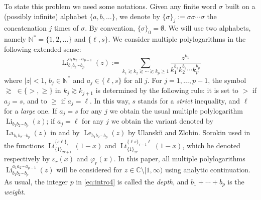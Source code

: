 \documentclass[reqno,12pt]{amsart}
\numberwithin{equation}{section}
\theoremstyle{remark}
\def\li{\operatorname{Li}}
\newcommand{\C}{\mathbb{C}}
\begin{document}
To state this problem we need some notations. 
Given any finite word $\sigma$ built on a (possibly infinite) alphabet $\{a,b, \ldots\}$, 
we denote by   $\{\sigma\}_j:=\sigma\sigma\cdots \sigma$   the 
concatenation $j$ times of $\sigma$. By convention, $\{\sigma\}_0=\emptyset$. We will use two alphabets, 
namely $\mathbb N^{*} = \{1,2,\ldots\}$ 
and $\{\ell,s\}$. We consider  multiple polylogarithms in the following extended sense:
\begin{equation}\label{eq:intro4}
\li_{b_1b_2\cdots b_p}^{a_1a_2\cdots a_{p-1}}(z):=
\sum_{k_1\gtrsim k_2\gtrsim \cdots \gtrsim k_p\ge 1} \frac{z^{k_1}}{k_1^{b_1}k_2^{b_2}\cdots k_p^{b_p}}
\end{equation}
where $\vert z\vert <1$, $b_j\in \mathbb N^{*} $ and $a_j\in\{\ell,s\}$ for all $j$. For $j=1, \ldots, p-1$, 
the symbol $\gtrsim\;\in \{>, \ge \}$ in $k_j\gtrsim k_{j+1}$ 
is determined by the following rule: it is set to $>$ if $a_j=s$,  and   
to $\ge$ if $a_j=\ell$. In this way, $s$ stands for a {\em strict} inequality, 
and $\ell$ for a {\em large} one. If $a_j = s$ for any $j$ we obtain the usual multiple 
polylogarithm $\li_{b_1b_2\cdots b_p} (z)$; if $a_j = \ell$ for any $j$ we obtain the variant 
denoted by $\operatorname{La}_{b_1b_2\cdots b_p} (z)$ in \cite{crefiri} and 
by $\operatorname{Le}_{b_1b_2\cdots b_p} (z)$ by  
Ulanski\u{\i} and Zlobin. Sorokin used in~\cite{sorokin1} the functions 
 $\li_{\{1\}_{2r+1}}^{\{s\ell\}_{r}}(1-x)$ and $\li_{\{1\}_{2r}}^{\{ \ell s\}_{r-1} \ell}(1-x)$, 
which he denoted respectively by $\varepsilon_r(x)$ and $\varphi_r(x)$. In this paper, all multiple polylogarithms $
\li_{b_1b_2\cdots b_p}^{a_1a_2\cdots a_{p-1}}(z)$  will be considered for $z\in\C\setminus [1,\infty)$ using analytic continuation.
As usual, the integer $p$ in \eqref{eq:intro4}   is called the {\em depth}, and $b_1+\cdots+b_p$ is the {\em weight}. 

  
\bigskip
\end{document}

